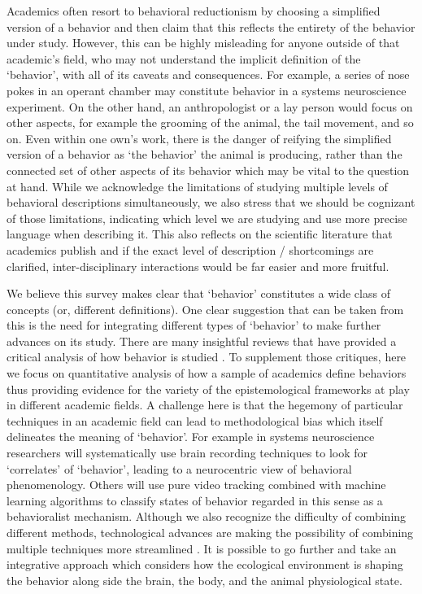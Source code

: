 \documentclass[a4paper, 11pt]{article}
\begin{document}
Academics often resort to behavioral reductionism by choosing a simplified version of a behavior and then claim that this reflects the entirety of the behavior under study. However, this can be highly misleading for anyone outside of that academic's field, who may not understand the implicit definition of the `behavior', with all of its caveats and consequences. For example, a series of nose pokes in an operant chamber may constitute behavior in a systems neuroscience experiment. On the other hand, an anthropologist or a lay person would focus on other aspects, for example the grooming of the animal, the tail movement, and so on. Even within one own's work, there is the danger of reifying the simplified version of a behavior as `the behavior' the animal is producing, rather than the connected set of other aspects of its behavior which may be vital to the question at hand. While we acknowledge the limitations of studying multiple levels of behavioral descriptions simultaneously, we also stress that we should be cognizant of those limitations, indicating which level we are studying and use more precise language when describing it. This also reflects on the scientific literature that academics publish and if the exact level of description / shortcomings are clarified, inter-disciplinary interactions would be far easier and more fruitful. 

We believe this survey makes clear that `behavior' constitutes a wide class of concepts (or, different definitions). One clear suggestion that can be taken from this is the need for integrating different types of `behavior' to make further advances on its study. There are many insightful reviews that have provided a critical analysis of how behavior is studied \cite{gomez2019life, krakauer2017neuroscience}. To supplement those critiques, here we focus on quantitative analysis of how a sample of academics define behaviors thus providing evidence for the variety of the epistemological frameworks at play in different academic fields. A challenge here is that the hegemony of particular techniques in an academic field can lead to methodological bias which itself delineates the meaning of `behavior'. For example in systems neuroscience researchers will systematically use brain recording techniques to look for `correlates' of `behavior', leading to a neurocentric view of behavioral phenomenology. Others will use pure video tracking combined with machine learning algorithms to classify states of behavior regarded in this sense as a behavioralist mechanism. Although we also recognize the difficulty of combining different methods, technological advances are making the possibility of combining multiple techniques more streamlined \cite{markowitz2018striatum}. It is possible to go further and take an integrative approach which considers how the ecological environment is shaping the behavior along side the brain, the body, and the animal physiological state. 
\end{document}
